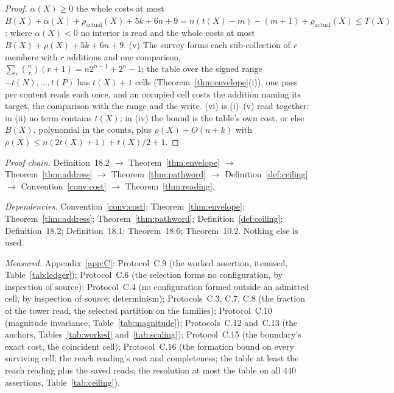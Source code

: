 \documentclass[pdflatex,sn-mathphys-num]{sn-jnl}
\theoremstyle{thmstyleone}%
\theoremstyle{thmstyletwo}%
\theoremstyle{thmstylethree}%
\newcommand{\deps}[1]{\par\begin{sloppypar}\noindent\emph{Dependencies.} #1 Nothing else is used.\end{sloppypar}}
\newcommand{\chain}[1]{\par\begin{sloppypar}\noindent\emph{Proof chain.} #1\end{sloppypar}}
\newcommand{\measured}[1]{\par\begin{sloppypar}\noindent\emph{Measured.} #1\end{sloppypar}}
\begin{document}
\begin{proof}
$\alpha(X)\ge0$ the whole costs at most $B(X)+\alpha(X)+\rho_{\mathrm{actual}}(X)+5k+6n+9=n(t(X)-m)-(m+1)+\rho_{\mathrm{actual}}(X)\le T(X)$; where $\alpha(X)<0$ no interior is read and the whole costs at most $B(X)+\rho(X)+5k+6n+9$. (v) The survey forms each sub-collection of $r$ members with $r$ additions and one comparison, $\sum_r\binom{n}{r}(r+1)=n2^{n-1}+2^n-1$; the table over the signed range $-t(N),\dots,t(P)$ has $t(X)+1$ cells (Theorem~\ref{thm:envelope}(i)), one pass per content reads each once, and an occupied cell costs the addition naming its target, the comparison with the range and the write. (vi) is (i)--(v) read together: in (ii) no term contains $t(X)$; in (iv) the bound is the table's own cost, or else $B(X)$, polynomial in the counts, plus $\rho(X)+O(n+k)$ with $\rho(X)\le n(2t(X)+1)+t(X)/2+1$.
\end{proof}
\chain{Definition~18.2 $\to$ Theorem~\ref{thm:envelope} $\to$ Theorem~\ref{thm:address} $\to$ Theorem~\ref{thm:pathword} $\to$ Definition~\ref{def:ceiling} $\to$ Convention~\ref{conv:cost} $\to$ Theorem~\ref{thm:reading}.}
\deps{Convention~\ref{conv:cost}; Theorem~\ref{thm:envelope}; Theorem~\ref{thm:address}; Theorem~\ref{thm:pathword}; Definition~\ref{def:ceiling}; Definition~18.2; Definition~18.1; Theorem~18.6; Theorem~10.2.}
\measured{Appendix~\ref{app:C}: Protocol~C.9 (the worked assertion, itemised, Table~\ref{tab:ledger}); Protocol~C.6 (the selection forms no configuration, by inspection of source); Protocol~C.4 (no configuration formed outside an admitted cell, by inspection of source; determinism); Protocols~C.3, C.7, C.8 (the fraction of the tower read, the selected partition on the families); Protocol~C.10 (magnitude invariance, Table~\ref{tab:magnitude}); Protocols~C.12 and~C.13 (the anchors, Tables~\ref{tab:worked} and~\ref{tab:scaling}); Protocol~C.15 (the boundary's exact cost, the coincident cell); Protocol~C.16 (the formation bound on every surviving cell; the reach reading's cost and completeness; the table at least the reach reading plus the saved reads; the resolution at most the table on all 440 assertions, Table~\ref{tab:ceiling}).}

\begin{table}[!htbp]
\centering\small
\caption{The ceiling on certificate assertions built to defeat the selection (Protocol~C.16): no zero, no coincident cell, $|P|=|N|=n/2$, asserted contents $\equiv1$ and reversed $\equiv0 \pmod n$; ten per row, means, operations under the one convention. The resolution returns the certificate on every one at no more than the table's cost (Theorem~\ref{thm:reading}(iv)); with the remainder class of Corollary~\ref{cor:remainder} asserted, the same family is decided at the boundary with no reading (Table~\ref{tab:remainder}). On the sampled family~B at $n=20$ the \ceilNc{} assertions with no coincident cell cost \ceilNcStruct{} operations on average against the table's \ceilNcTable{}, the ceiling firing on \ceilNcFired{}; the \ceilCo{} with one cost \ceilCoStruct{}.}
\label{tab:ceiling}

\end{table}
\end{document}
